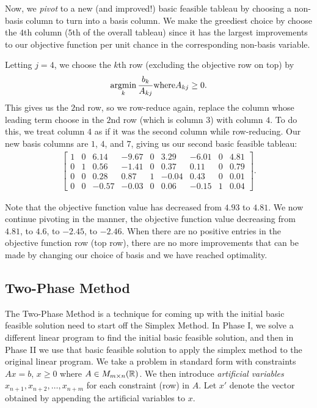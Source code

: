 Now, we \emph{pivot} to a new (and improved!) basic feasible tableau by choosing a non-basis column to turn into a basis column. We make the greediest choice by choose the $4$th column ($5$th of the overall tableau) since it has the largest improvements to our objective function per unit chance in the corresponding non-basis variable.

Letting $j = 4$, we choose the $k$th row (excluding the objective row on top) by \[\operatorname*{argmin}_{k}\frac{b_k}{A_{kj}} \mathrm{ where } A_{kj} \geq 0.\] This gives us the $2$nd row, so we row-reduce again, replace the column whose leading term choose in the $2$nd row (which is column $3$) with column $4$. To do this, we treat column $4$ as if it was the second column while row-reducing. Our new basis columns are $1$, $4$, and $7$, giving us our second basic feasible tableau:
\begin{align*}
    \left[\begin{array}{c|ccccccc|c}
        1 & 0 & 6.14  & -9.67 & 0 & 3.29  & -6.01 & 0 & 4.81 \\
        \hline
        0 & 1 & 0.56  & -1.41 & 0 & 0.37  & 0.11  & 0 & 0.79 \\
        0 & 0 & 0.28  & 0.87  & 1 & -0.04 & 0.43  & 0 & 0.01 \\
        0 & 0 & -0.57 & -0.03 & 0 & 0.06  & -0.15 & 1 & 0.04
    \end{array}\right].
\end{align*}

Note that the objective function value has decreased from $4.93$ to $4.81$. We now continue pivoting in the manner, the objective function value decreasing from $4.81$, to $4.6$, to $-2.45$, to $-2.46$. When there are no positive entries in the objective function row (top row), there are no more improvements that can be made by changing our choice of basis and we have reached optimality.

\subsection{Two-Phase Method}

The Two-Phase Method is a technique for coming up with the initial basic feasible solution need to start off the Simplex Method. In Phase I, we solve a different linear program to find the initial basic feasible solution, and then in Phase II we use that basic feasible solution to apply the simplex method to the original linear program. We take a problem in standard form with constraints $Ax = b$, $x \geq 0$ where $A \in M_{m \times n}(\mathbb{R})$. We then introduce \emph{artificial variables} $x_{n+1}, x_{n+2}, \ldots, x_{n+m}$ for each constraint (row) in $A$. Let $x'$ denote the vector obtained by appending the artificial variables to $x$.

